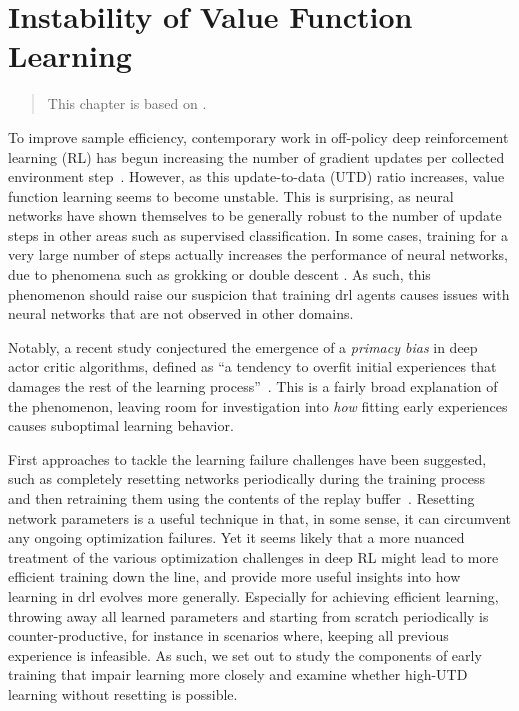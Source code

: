 \chapter{Instability of Value Function Learning}
\label{chap:overestimation}

\begin{quote}
    This chapter is based on .
\end{quote}

To improve sample efficiency, contemporary work in off-policy deep reinforcement learning (RL) has begun increasing the number of gradient updates per collected environment step~\parencite{janner2019mbpo,fedus2020revisiting,chen2021randomized, hiraoka2022dropout, nikishin2022primacy, doro2023barrier, schwarzer2023bigger, kim2023resetensemble}.  
However, as this update-to-data (UTD) ratio increases, value function learning seems to become unstable.
This is surprising, as neural networks have shown themselves to be generally robust to the number of update steps in other areas such as supervised classification.
In some cases, training for a very large number of steps actually increases the performance of neural networks, due to phenomena such as grokking \parencite{power2022grokking} or double descent \parencite{belkin2019reconciling}.
As such, this phenomenon should raise our suspicion that training \ac{drl} agents causes issues with neural networks that are not observed in other domains.

Notably, a recent study conjectured the emergence of a \emph{primacy bias} in deep actor critic algorithms, defined as ``a tendency to overfit initial experiences that damages the rest of the learning process''~\parencite{nikishin2022primacy}. 
This is a fairly broad explanation of the phenomenon, leaving room for investigation into \emph{how} fitting early experiences causes suboptimal learning behavior.

First approaches to tackle the learning failure challenges have been suggested, such as completely resetting networks periodically during the training process and then retraining them using the contents of the replay buffer~\parencite{nikishin2022primacy, doro2023barrier}. 
Resetting network parameters is a useful technique in that, in some sense, it can circumvent any ongoing optimization failures. 
Yet it seems likely that a more nuanced treatment of the various optimization challenges in deep RL might lead to more efficient training down the line, and provide more useful insights into how learning in \ac{drl} evolves more generally. 
Especially for achieving efficient learning, throwing away all learned parameters and starting from scratch periodically is counter-productive, for instance in scenarios where, keeping all previous experience is infeasible. %
As such, we set out to study the components of early training that impair learning more closely and examine whether high-UTD learning without resetting is possible.


